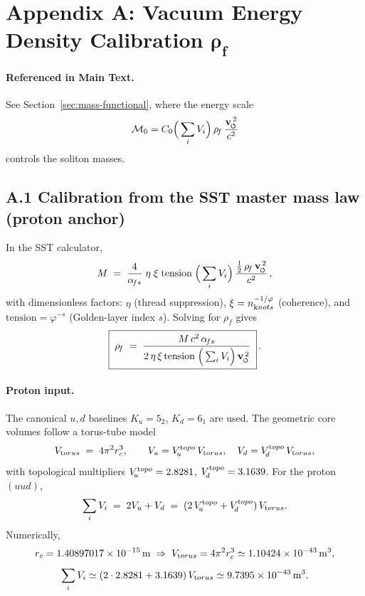 \documentclass[smallextended]{svjour3}       %
\newcommand{\swirlarrow}{%
	\mathchoice{\mkern-2mu\scriptstyle\boldsymbol{\circlearrowleft}}%
	{\mkern-2mu\scriptstyle\boldsymbol{\circlearrowleft}}%
	{\mkern-2mu\scriptscriptstyle\boldsymbol{\circlearrowleft}}%
	{\mkern-2mu\scriptscriptstyle\boldsymbol{\circlearrowleft}}%
}
\newcommand{\vswirl}{\mathbf{v}_{\swirlarrow}}
\newcommand{\rhoF}{\rho_{\!f}}      %
\begin{document}
\section*{Appendix A: Vacuum Energy Density Calibration \texorpdfstring{\(\boldsymbol{\rhoF}\)}{rho0}}
\label{sec:calibration_rho0}

	\paragraph{Referenced in Main Text.}
	See Section~\ref{sec:mass-functional}, where the energy scale
	\[
		\mathcal{M}_0 = C_0 \Big(\sum_i V_i\Big)\,\rhoF\,\frac{\vswirl^{\,2}}{c^2}
	\]
	controls the soliton masses.

	\subsection*{A.1 Calibration from the SST master mass law (proton anchor)}
	In the SST calculator,
	\[
		M \;=\; \frac{4}{\alpha_{\!fs}}\;\eta\;\xi\;\text{tension}\;\Big(\sum_i V_i\Big)\,
		\frac{\tfrac12\,\rhoF\,\vswirl^{\,2}}{c^2}\,,
	\]
	with dimensionless factors:
	\(\eta\) (thread suppression), \(\xi=n_{\textrm knots}^{-1/\varphi}\) (coherence), and \(\text{tension}=\varphi^{-s}\) (Golden-layer index \(s\)).
	Solving for \(\rhoF\) gives
	\begin{equation}
		\boxed{\;
		\rhoF \;=\; \frac{M\,c^2\,\alpha_{\!fs}}
		{2\,\eta\,\xi\,\text{tension}\;\Big(\sum_i V_i\Big)\,\vswirl^{\,2}}\; } \,.
		\label{eq:rho0-solve}
	\end{equation}

	\paragraph{Proton input.}
	The canonical \(u,d\) baselines \(K_u=5_2\), \(K_d=6_1\) are used.
	The geometric core volumes follow a torus-tube model
	\[
		V_{\textrm torus} \;=\; 4\pi^2 r_c^3,\qquad
		V_u = V_{\!u}^{\textrm topo}\,V_{\textrm torus},\quad V_d = V_{\!d}^{\textrm topo}\,V_{\textrm torus},
	\]
	with topological multipliers
	\(V_{\!u}^{\textrm topo}=2.8281\), \(V_{\!d}^{\textrm topo}=3.1639\).
	For the proton \((uud)\),
	\[
		\sum_i V_i \;=\; 2V_u + V_d \;=\; (2\,V_{\!u}^{\textrm topo}+V_{\!d}^{\textrm topo})\,V_{\textrm torus}.
	\]
	Numerically,
	\[
		r_c = 1.40897017\times 10^{-15}\,\mathrm{m}
		\;\Rightarrow\;
		V_{\textrm torus} = 4\pi^2 r_c^3 \simeq 1.10424\times10^{-43}\,\mathrm{m^3},
	\]
	\[
		\sum_i V_i \simeq (2\cdot 2.8281 + 3.1639)\,V_{\textrm torus}
		\simeq 9.7395\times 10^{-43}\,\mathrm{m^3}.
	\]
\end{document}

